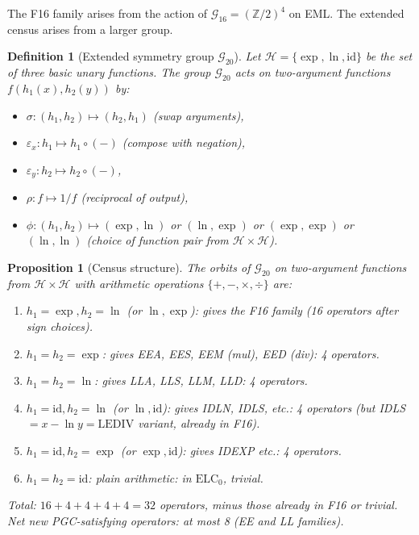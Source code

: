 \documentclass[11pt]{article}
\newtheorem{proposition}[theorem]{Proposition}
\newtheorem{definition}[theorem]{Definition}
\begin{document}
The F16 family arises from the action of $\mathcal{G}_{16} = (\mathbb{Z}/2)^4$
on EML. The extended census arises from a larger group.

\begin{definition}[Extended symmetry group $\mathcal{G}_{20}$]
Let $\mathcal{H} = \{\exp, \ln, \mathrm{id}\}$ be the set of three basic unary
functions. The group $\mathcal{G}_{20}$ acts on two-argument functions
$f(h_1(x), h_2(y))$ by:
\begin{itemize}
  \item $\sigma : (h_1, h_2) \mapsto (h_2, h_1)$ (swap arguments),
  \item $\varepsilon_x : h_1 \mapsto h_1 \circ (- )$ (compose with negation),
  \item $\varepsilon_y : h_2 \mapsto h_2 \circ (-)$,
  \item $\rho : f \mapsto 1/f$ (reciprocal of output),
  \item $\phi : (h_1, h_2) \mapsto (\exp, \ln)$ or $(\ln, \exp)$ or $(\exp, \exp)$ or $(\ln, \ln)$
        (choice of function pair from $\mathcal{H} \times \mathcal{H}$).
\end{itemize}
\end{definition}

\begin{proposition}[Census structure]
The orbits of $\mathcal{G}_{20}$ on two-argument functions from $\mathcal{H} \times \mathcal{H}$
with arithmetic operations $\{+,-,\times,\div\}$ are:
\begin{enumerate}
  \item $h_1 = \exp, h_2 = \ln$ (or $\ln, \exp$): gives the F16 family (16 operators after sign choices).
  \item $h_1 = h_2 = \exp$: gives EEA, EES, EEM (mul), EED (div): 4 operators.
  \item $h_1 = h_2 = \ln$: gives LLA, LLS, LLM, LLD: 4 operators.
  \item $h_1 = \mathrm{id}, h_2 = \ln$ (or $\ln, \mathrm{id}$): gives IDLN, IDLS, etc.: 4 operators
        (but IDLS $= x - \ln y = \mathrm{LEDIV}$ variant, already in F16).
  \item $h_1 = \mathrm{id}, h_2 = \exp$ (or $\exp, \mathrm{id}$): gives IDEXP etc.: 4 operators.
  \item $h_1 = h_2 = \mathrm{id}$: plain arithmetic: in $\mathrm{ELC}_0$, trivial.
\end{enumerate}
Total: $16 + 4 + 4 + 4 + 4 = 32$ operators, minus those already in F16 or trivial.
Net new PGC-satisfying operators: at most 8 (EE and LL families).
\end{proposition}
\end{document}
